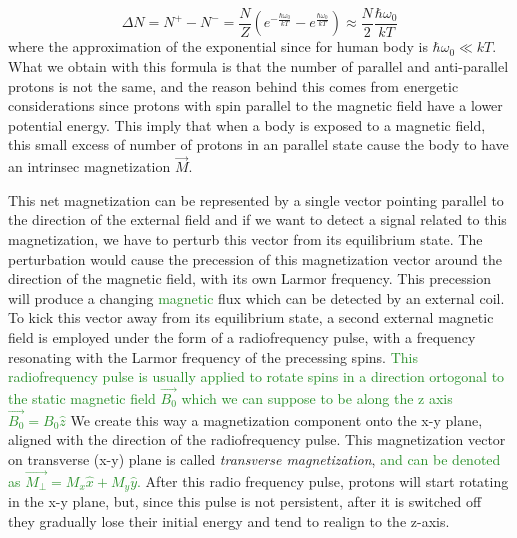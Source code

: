 \documentclass[11pt]{report}
\begin{document}
{\begin{equation}
\Delta N = N^+ - N^- = \frac{N}{Z}(e^{-\frac{\hbar \omega_0}{kT}} - e^{\frac{\hbar \omega_0}{kT}}) \approx \frac{N}{2}\frac{\hbar \omega_0}{kT}
\end{equation}
where the approximation of the exponential since for human body is $\hbar \omega_0 \ll kT$.
What we obtain with this formula is that the number of parallel and anti-parallel protons is not the same, and the reason behind this comes from energetic considerations since protons with spin parallel to the magnetic field have a lower potential energy.
This imply that when a body is exposed to a magnetic field, this small excess of number of protons in an parallel state cause the body to have an intrinsec magnetization $\vec{M}$.
}

This net magnetization can be represented by a single vector pointing parallel to the direction of the external field and if we want to detect a signal related to this magnetization, we have to perturb this vector from its equilibrium state.
The perturbation would cause the precession of this magnetization vector around the direction of the magnetic field, with its own Larmor frequency.
This precession will produce a changing \textcolor{ForestGreen}{magnetic} flux which can be detected by an external coil.
To kick this vector away from its equilibrium state, a second external magnetic field is employed under the form of a radiofrequency pulse, with a frequency resonating with the Larmor frequency of the precessing spins.
\textcolor{ForestGreen}{
This radiofrequency pulse is usually applied to rotate spins in a direction ortogonal to the static magnetic field $\vec{B_0}$ which we can suppose to be along the z axis $\vec{B_0} = B_0 \hat z$
}
We create this way a magnetization component onto the x-y plane, aligned with the direction of the radiofrequency pulse.
This magnetization vector on transverse (x-y) plane is called \emph{transverse magnetization},\textcolor{ForestGreen}{ and can be denoted as $\vec{M_\perp} = M_x \hat x + M_y \hat y$.}
After this radio frequency pulse, protons will start rotating in the x-y plane, but, since this pulse is not persistent, after it is switched off they gradually lose their initial energy and tend to realign to the z-axis.
\end{document}
